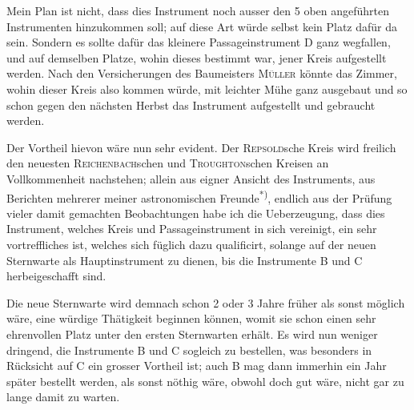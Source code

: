 Mein Plan ist nicht, dass dies Instrument noch ausser den 5 oben angeführten Instrumenten hinzukommen soll; auf diese Art würde selbst kein Platz dafür da sein. Sondern es sollte dafür das kleinere Passageinstrument D ganz wegfallen, und auf demselben Platze, wohin dieses bestimmt war, jener Kreis aufgestellt werden. Nach den Versicherungen des Baumeisters \textsc{Müller} könnte das Zimmer, wohin dieser Kreis also kommen würde, mit leichter Mühe ganz ausgebaut und so schon gegen den nächsten Herbst das Instrument aufgestellt und gebraucht werden.

Der Vortheil hievon wäre nun sehr evident. Der \textsc{Repsold}sche Kreis wird freilich den neuesten \textsc{Reichenbach}schen und \textsc{Troughton}schen Kreisen an Vollkommenheit nachstehen; allein aus eigner Ansicht des Instruments, aus
\clearpage{}
\noindent Berichten mehrerer meiner astronomischen Freunde\textsuperscript{*)}, endlich aus der Prüfung vieler damit gemachten Beobachtungen habe ich die Ueberzeugung, dass dies Instrument, welches Kreis und Passageinstrument in sich vereinigt, ein sehr vortreffliches ist, welches sich füglich dazu qualificirt, solange auf der neuen Sternwarte als Hauptinstrument zu dienen, bis die Instrumente B und C herbeigeschafft sind.
\begingroup\renewcommand{\thefootnote}{*)}\endgroup

Die neue Sternwarte wird demnach schon 2 oder 3 Jahre früher als sonst möglich wäre, eine würdige Thätigkeit beginnen können, womit sie schon einen sehr ehrenvollen Platz unter den ersten Sternwarten erhält. Es wird nun weniger dringend, die Instrumente B und C sogleich zu bestellen, was besonders in Rücksicht auf C ein grosser Vortheil ist; auch B mag dann immerhin ein Jahr später bestellt werden, als sonst nöthig wäre, obwohl doch gut wäre, nicht gar zu lange damit zu warten.

